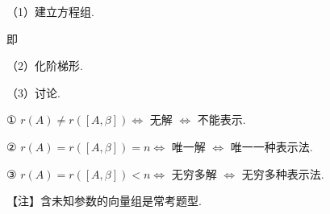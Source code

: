 
（1）建立方程组.


即


（2）化阶梯形.


（3）讨论.

① $r(A)\ne r([A,\beta])\iff$ 无解 $\iff$ 不能表示.

② $r(A)=r([A,\beta])=n\iff$ 唯一解 $\iff$ 唯一一种表示法.

③ $r(A)=r([A,\beta])<n\iff$ 无穷多解 $\iff$ 无穷多种表示法.

\begin{fnote}
【注】含未知参数的向量组是常考题型.
\end{fnote}

